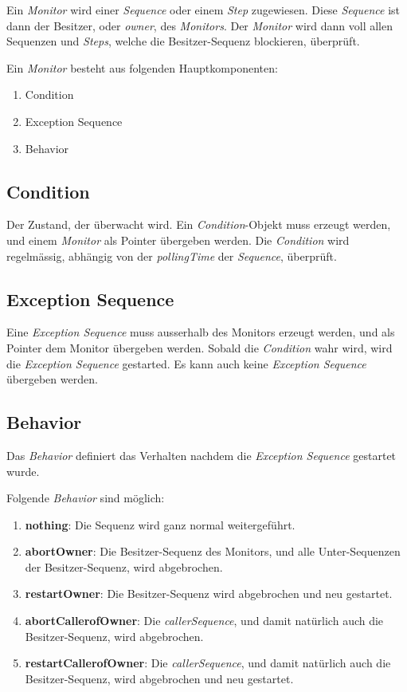 Ein \textit{Monitor} wird einer \textit{Sequence} oder einem \textit{Step} zugewiesen.
Diese \textit{Sequence} ist dann der Besitzer, oder \textit{owner}, des \textit{Monitors}.
Der \textit{Monitor} wird dann voll allen Sequenzen und \textit{Steps}, welche die Besitzer-Sequenz blockieren, überprüft.

Ein \textit{Monitor} besteht aus folgenden Hauptkomponenten:
\begin{enumerate}
\item Condition 
\item Exception Sequence
\item Behavior
\end{enumerate}

\subsection{Condition}
Der Zustand, der überwacht wird.
Ein \textit{Condition}-Objekt muss erzeugt werden, und einem \textit{Monitor} als Pointer übergeben werden.
Die \textit{Condition} wird regelmässig, abhängig von der \textit{pollingTime} der \textit{Sequence}, überprüft.


\subsection{Exception Sequence}
Eine \textit{Exception Sequence} muss ausserhalb des Monitors erzeugt werden, und als Pointer dem Monitor übergeben werden.
Sobald die \textit{Condition} wahr wird, wird die \textit{Exception Sequence} gestarted.
Es kann auch keine \textit{Exception Sequence} übergeben werden.

\subsection{Behavior}
Das \textit{Behavior} definiert das Verhalten nachdem die \textit{Exception Sequence} gestartet wurde.

Folgende \textit{Behavior} sind möglich:
\begin{enumerate}
\item \textbf{nothing}: Die Sequenz wird ganz normal weitergeführt.
\item \textbf{abortOwner}: Die Besitzer-Sequenz des Monitors, und alle Unter-Sequenzen der Besitzer-Sequenz, wird abgebrochen.
\item \textbf{restartOwner}: Die Besitzer-Sequenz wird abgebrochen und neu gestartet.
\item \textbf{abortCallerofOwner}: Die \textit{callerSequence}, und damit natürlich auch die Besitzer-Sequenz, wird abgebrochen.
\item \textbf{restartCallerofOwner}: Die \textit{callerSequence}, und damit natürlich auch die Besitzer-Sequenz, wird abgebrochen und neu gestartet.
\end{enumerate}



